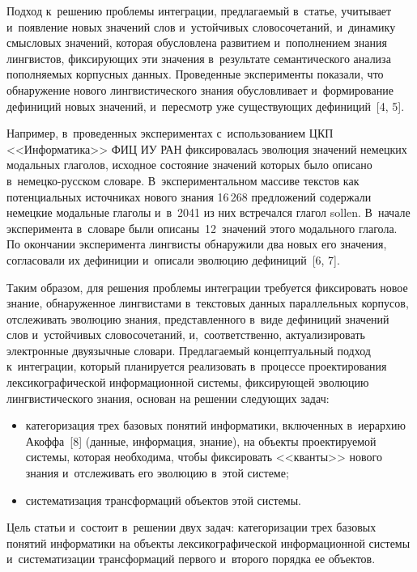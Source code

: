 \begin{multicols}{2}
  Подход к~решению проблемы интеграции, предлагаемый в~статье, учитывает 
  и~появление новых значений слов и~устойчивых словосочетаний, и~динамику 
смысловых значений, которая обусловлена развитием и~пополнением знания 
лингвистов, фиксирующих эти значения в~результате семантического анализа 
пополняемых корпусных данных. Проведенные эксперименты показали, что 
обнаружение нового лингвистического знания обусловливает и~формирование 
дефиниций новых значений, и~пересмотр уже существующих дефиниций~[4, 5].
  
  Например, в~проведенных экспериментах с~использованием ЦКП 
<<Информатика>> ФИЦ ИУ РАН фиксировалась эволюция значений немецких 
модальных глаголов, исходное состояние значений которых было описано 
в~не\-мец\-ко-рус\-ском словаре. В~экспериментальном массиве текстов как 
потенциальных источниках нового знания 16\,268 предложений содержали 
немецкие модальные глаголы и~в~2041 из них встречался глагол sollen. 
В~начале эксперимента в~словаре были описаны~12~значений этого модального 
глагола. По окончании эксперимента лингвисты обнаружили два новых его 
значения, согласовали их дефиниции и~описали эволюцию дефиниций~[6, 7].
  
  Таким образом, для решения проблемы интеграции требуется фиксировать 
новое знание, обнаруженное лингвистами в~текстовых данных параллельных 
корпусов, отслеживать эволюцию знания, представленного в~виде дефиниций 
значений слов и~устойчивых словосочетаний, и,~соответственно, 
актуализировать электронные двуязычные словари. Предлагаемый 
концептуальный подход к~интеграции, который планируется реализовать 
в~процессе проектирования лексикографической информационной сис\-те\-мы, 
фиксирующей эволюцию лингвистического знания, основан на решении 
следующих задач:\\[-14pt]
  \begin{itemize}
  \item категоризация трех базовых понятий информатики, включенных 
  в~иерархию Акоффа~[8] (данные, информация, знание), на объекты 
проектируемой сис\-те\-мы, которая необходима, чтобы фиксировать 
<<кванты>> нового знания и~отслеживать его эволюцию в~этой сис\-теме;\\[-15pt]
  \item  систематизация трансформаций объектов этой сис\-темы.\\[-14pt]
  \end{itemize}
  
  Цель статьи и~состоит в~решении двух задач: категоризации трех базовых 
понятий информатики на объекты лексикографической информационной  
сис\-те\-мы и~сис\-те\-ма\-ти\-за\-ции трансформаций первого и~второго порядка 
ее объектов.
  

\end{multicols}
